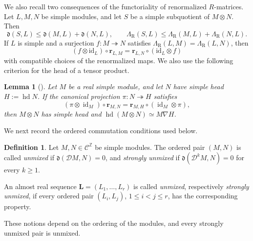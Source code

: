 \documentclass[12pt, reqno]{amsart}
\theoremstyle{plain}
\newtheorem{lemma}[theorem]{Lemma}
\theoremstyle{definition}
\newtheorem{definition}[theorem]{Definition}
\numberwithin{equation}{section}
\newcommand{\ZZ}{\mathbb{Z}}
\newcommand{\LambdaR}{\Lambda_{\mathrm R}}
\begin{document}
We also recall two consequences of the functoriality of renormalized
\(R\)-matrices. Let \(L,M,N\) be simple modules, and let
\(S\) be a simple subquotient of \(M\otimes N\). Then
\begin{equation}\label{eq:R-matrix-subquotient-inequalities}
    \mathfrak d(S,L)
    \leq\mathfrak d(M,L)+\mathfrak d(N,L),
    \qquad
    \LambdaR(S,L)
    \leq\LambdaR(M,L)+\LambdaR(N,L).
\end{equation}
If \(L\) is simple and a surjection \(f\colon M\twoheadrightarrow N\)
satisfies \(\LambdaR(L,M)=\LambdaR(L,N)\), then
\begin{equation}\label{eq:R-matrix-naturality}
    (f\otimes\mathrm{id}_L)\circ\mathbf r_{L,M}=\mathbf r_{L,N}\circ(\mathrm{id}_L\otimes f)
\end{equation}
with compatible choices of the renormalized maps. We also use the
following criterion for the head of a tensor product.

\begin{lemma}[\cite{kashiwara2020monoidal}]\label{lem:head}
    Let \(M\) be a real simple module, and let \(N\) have simple head
    \(H:=\operatorname{hd}N\). If the canonical projection
    \(\pi\colon N\twoheadrightarrow H\) satisfies
    \begin{equation}\label{eq:head-criterion-R-matrix}
        (\pi\otimes\operatorname{id}_M)\circ\mathbf r_{M,N}
        =\mathbf r_{M,H}\circ(\operatorname{id}_M\otimes\pi),
    \end{equation}
    then \(M\otimes N\) has simple head and
    \(\operatorname{hd}(M\otimes N)\simeq M\nabla H\).
\end{lemma}

We next record the ordered commutation conditions used below.

\begin{definition}
    Let \(M,N\in\mathscr C^{\ZZ}\) be simple modules. The ordered pair
    \((M,N)\) is called \emph{unmixed} if
    \(\mathfrak d(\mathcal D M,N)=0\), and \emph{strongly unmixed} if
    \(\mathfrak d(\mathcal D^kM,N)=0\) for every \(k\geq1\).

    An almost real sequence \(\mathbf L=(L_1,\ldots,L_r)\) is called
    \emph{unmixed}, respectively \emph{strongly unmixed}, if every ordered
    pair \((L_i,L_j)\), \(1\leq i<j\leq r\), has the corresponding
    property.
\end{definition}

These notions depend on the ordering of the modules, and every strongly
unmixed pair is unmixed.
\end{document}
